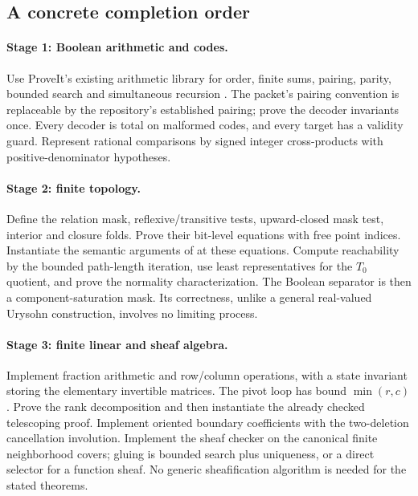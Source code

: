 \subsection{A concrete completion order}

\paragraph{Stage 1: Boolean arithmetic and codes.}
Use ProveIt's existing arithmetic library for order, finite sums, pairing, parity, bounded search and simultaneous recursion \cite{RepoDerivations}. The packet's pairing convention is replaceable by the repository's established pairing; prove the decoder invariants once. Every decoder is total on malformed codes, and every target has a validity guard. Represent rational comparisons by signed integer cross-products with positive-denominator hypotheses.

\paragraph{Stage 2: finite topology.}
Define the relation mask, reflexive/transitive tests, upward-closed mask test, interior and closure folds. Prove their bit-level equations with free point indices. Instantiate the semantic arguments of  at these equations. Compute reachability by the bounded path-length iteration, use least representatives for the $T_0$ quotient, and prove the normality characterization. The Boolean separator is then a component-saturation mask. Its correctness, unlike a general real-valued Urysohn construction, involves no limiting process.

\paragraph{Stage 3: finite linear and sheaf algebra.}
Implement fraction arithmetic and row/column operations, with a state invariant storing the elementary invertible matrices. The pivot loop has bound $\min(r,c)$. Prove the rank decomposition and then instantiate the already checked telescoping proof. Implement oriented boundary coefficients with the two-deletion cancellation involution. Implement the sheaf checker on the canonical finite neighborhood covers; gluing is bounded search plus uniqueness, or a direct selector for a function sheaf. No generic sheafification algorithm is needed for the stated theorems.

